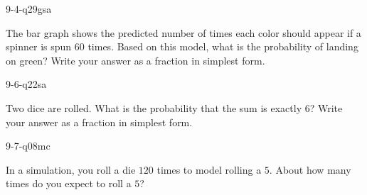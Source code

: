 \begin{practiceQuestion}{9-4-q29}{gsa}
\begin{questionText}
The bar graph shows the predicted number of times each color should appear if a spinner is spun $60$ times. Based on this model, what is the probability of landing on green? Write your answer as a fraction in simplest form.

\begin{center}
\end{center}
\end{questionText}
\end{practiceQuestion}

\begin{practiceQuestion}{9-6-q22}{sa}
\begin{questionText}
Two dice are rolled. What is the probability that the sum is exactly $6$? Write your answer as a fraction in simplest form.
\end{questionText}
\end{practiceQuestion}

\begin{practiceQuestion}{9-7-q08}{mc}
\begin{questionText}
In a simulation, you roll a die $120$ times to model rolling a $5$. About how many times do you expect to roll a $5$?
\end{questionText}
\end{practiceQuestion}
